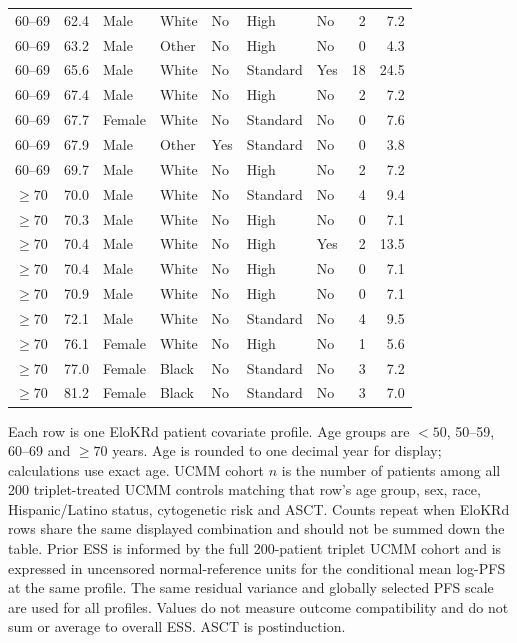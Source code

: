 \documentclass[11pt]{article}
\theoremstyle{remark}\newtheorem{remark}{Remark}[section]
\begin{document}
\begin{longtable}{lrlllllrr}
60--69 & 62.4 & Male & White & No & High & No & 2 & 7.2 \\
60--69 & 63.2 & Male & Other & No & High & No & 0 & 4.3 \\
60--69 & 65.6 & Male & White & No & Standard & Yes & 18 & 24.5 \\
60--69 & 67.4 & Male & White & No & High & No & 2 & 7.2 \\
60--69 & 67.7 & Female & White & No & Standard & No & 0 & 7.6 \\
60--69 & 67.9 & Male & Other & Yes & Standard & No & 0 & 3.8 \\
60--69 & 69.7 & Male & White & No & High & No & 2 & 7.2 \\
\addlinespace[3pt]
$\geq70$ & 70.0 & Male & White & No & Standard & No & 4 & 9.4 \\
$\geq70$ & 70.3 & Male & White & No & High & No & 0 & 7.1 \\
$\geq70$ & 70.4 & Male & White & No & High & Yes & 2 & 13.5 \\
$\geq70$ & 70.4 & Male & White & No & High & No & 0 & 7.1 \\
$\geq70$ & 70.9 & Male & White & No & High & No & 0 & 7.1 \\
$\geq70$ & 72.1 & Male & White & No & Standard & No & 4 & 9.5 \\
$\geq70$ & 76.1 & Female & White & No & High & No & 1 & 5.6 \\
$\geq70$ & 77.0 & Female & Black & No & Standard & No & 3 & 7.2 \\
$\geq70$ & 81.2 & Female & Black & No & Standard & No & 3 & 7.0 \\
\end{longtable}
\noindent\begin{minipage}{\linewidth}\footnotesize Each row is one EloKRd patient covariate profile. Age groups are $<50$, 50--59, 60--69 and $\geq70$ years. Age is rounded to one decimal year for display; calculations use exact age. UCMM cohort $n$ is the number of patients among all 200 triplet-treated UCMM controls matching that row's age group, sex, race, Hispanic/Latino status, cytogenetic risk and ASCT. Counts repeat when EloKRd rows share the same displayed combination and should not be summed down the table. Prior ESS is informed by the full 200-patient triplet UCMM cohort and is expressed in uncensored normal-reference units for the conditional mean log-PFS at the same profile. The same residual variance and globally selected PFS scale are used for all profiles. Values do not measure outcome compatibility and do not sum or average to overall ESS. ASCT is postinduction.\end{minipage}
\endgroup
  
\end{document}
